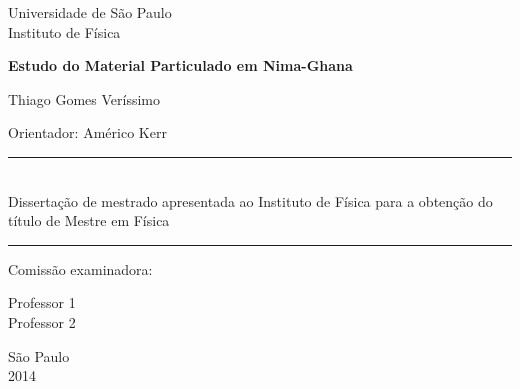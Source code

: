 \begin{titlepage}
\setlength{\voffset}{0pt}
\setlength{\hoffset}{0pt}
\centering
\Large{Universidade de São Paulo \\
Instituto de Física}

\LARGE{\bf Estudo do Material Particulado em Nima-Ghana
}


\Large{ Thiago Gomes Veríssimo
}


\begin{flushright}

\begin{minipage}{.6\textwidth}
\large{Orientador: Américo Kerr
}
\end{minipage}


\begin{minipage}{.6\textwidth}
\rule{\linewidth}{0.5mm}\\
\large{
Dissertação de mestrado apresentada ao Instituto de Física para a obtenção do 
título de Mestre em Física
}

\rule{\linewidth}{0.5mm}
\end{minipage}
\end{flushright}


\begin{flushleft}

\normalsize
Comissão examinadora:\\
\hspace{.03\textwidth}\begin{minipage}{.97\textwidth}
Professor 1 \\
Professor 2
\end{minipage}
\end{flushleft}


São Paulo\\
2014

\end{titlepage}

